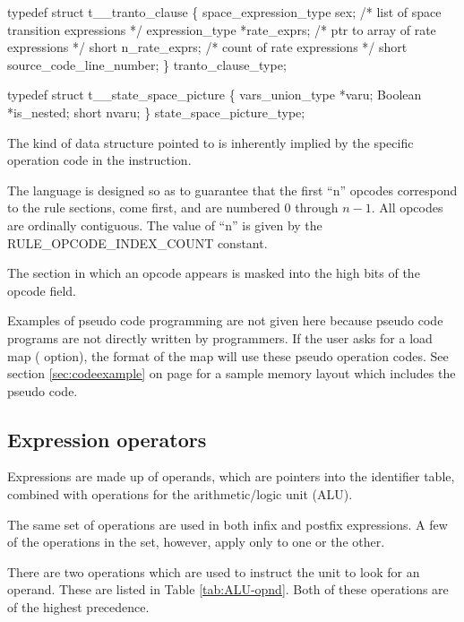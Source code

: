 \begin{codeexample}
typedef struct t__tranto_clause
   \{
       space_expression_type sex;   /* list of space transition expressions */
       expression_type *rate_exprs; /* ptr to array of rate expressions */
       short n_rate_exprs;          /* count of rate expressions */
       short source_code_line_number;
   \} tranto_clause_type;
\end{codeexample}

\begin{codeexample}
typedef struct t__state_space_picture
   \{
       vars_union_type *varu;
       Boolean *is_nested;
       short nvaru;
   \} state_space_picture_type;
\end{codeexample}

The kind of data structure pointed to is inherently implied by the specific
operation code in the instruction.

The language is designed so as to guarantee that the first ``n''
opcodes correspond to the rule sections, come first, and
are numbered $0$ through $n-1$.   All opcodes are ordinally contiguous.
The value of ``n'' is given by the RULE\_OPCODE\_INDEX\_COUNT constant.

The section in which an opcode appears is masked into the high bits of
the opcode field.

Examples of pseudo code programming are not given here because pseudo
code programs are not directly written by programmers.   If the user
asks for a load map ( option), the format of the map
will use these pseudo operation codes.   See section \ref{sec:codeexample}
on page \pageref{sec:codeexample} for a sample memory layout which includes
the pseudo code.

\subsection{Expression operators}
\label{sec:ops}

Expressions are made up of operands, which are pointers into the identifier
table, combined with operations for the arithmetic/logic unit (ALU).

The same set of operations are used in both infix and postfix expressions.
A few of the operations in the set, however, apply only to one or the other.

There are two operations which are used to instruct the unit to look
for an operand.  These are listed in Table \ref{tab:ALU-opnd}.
Both of these operations are of the highest precedence.

